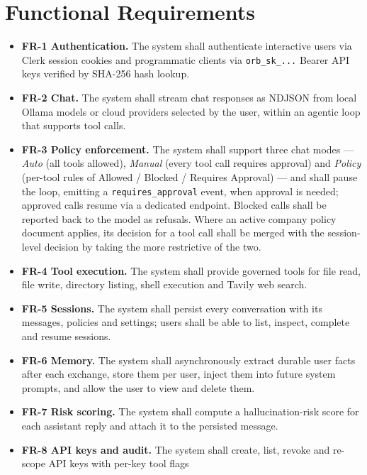 \documentclass[12pt,a4paper,oneside]{report}
\begin{document}
\section{Functional Requirements}
\begin{itemize}
  \item \textbf{FR-1 Authentication.} The system shall authenticate
        interactive users via Clerk session cookies and programmatic
        clients via \texttt{orb\_sk\_...} Bearer API keys verified by
        SHA-256 hash lookup.
  \item \textbf{FR-2 Chat.} The system shall stream chat responses as
        NDJSON from local Ollama models or cloud providers selected by
        the user, within an agentic loop that supports tool calls.
  \item \textbf{FR-3 Policy enforcement.} The system shall support
        three chat modes --- \emph{Auto} (all tools allowed),
        \emph{Manual} (every tool call requires approval) and
        \emph{Policy} (per-tool rules of Allowed / Blocked / Requires
        Approval) --- and shall pause the loop, emitting a
        \texttt{requires\_approval} event, when approval is needed;
        approved calls resume via a dedicated endpoint. Blocked calls
        shall be reported back to the model as refusals. Where an
        active company policy document applies, its decision for a
        tool call shall be merged with the session-level decision by
        taking the more restrictive of the two.
  \item \textbf{FR-4 Tool execution.} The system shall provide
        governed tools for file read, file write, directory listing,
        shell execution and Tavily web search.
  \item \textbf{FR-5 Sessions.} The system shall persist every
        conversation with its messages, policies and settings; users
        shall be able to list, inspect, complete and resume sessions.
  \item \textbf{FR-6 Memory.} The system shall asynchronously extract
        durable user facts after each exchange, store them per user,
        inject them into future system prompts, and allow the user to
        view and delete them.
  \item \textbf{FR-7 Risk scoring.} The system shall compute a
        hallucination-risk score for each assistant reply and attach
        it to the persisted message.
  \item \textbf{FR-8 API keys and audit.} The system shall create,
        list, revoke and re-scope API keys with per-key tool flags

\end{itemize}
\end{document}
